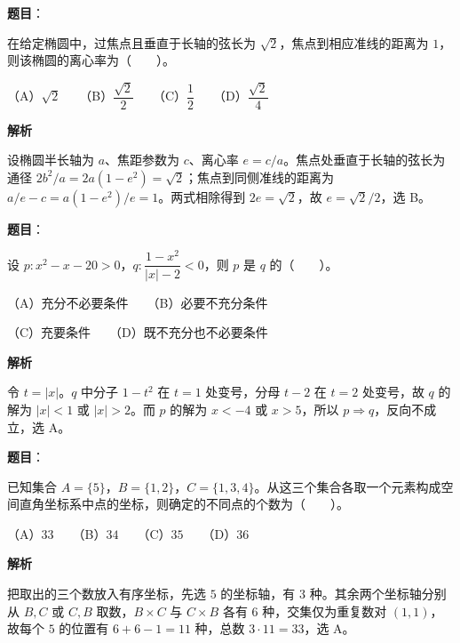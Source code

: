 \begin{answer}

\textbf{题目}：

在给定椭圆中，过焦点且垂直于长轴的弦长为 $\sqrt2$，焦点到相应准线的距离为 $1$，则该椭圆的离心率为\mbox{（　　）}。

（A）$\sqrt2$　　（B）$\dfrac{\sqrt2}{2}$　　（C）$\dfrac12$　　（D）$\dfrac{\sqrt2}{4}$

\textbf{解析}

设椭圆半长轴为 $a$、焦距参数为 $c$、离心率 $e=c/a$。焦点处垂直于长轴的弦长为通径 $2b^2/a=2a(1-e^2)=\sqrt2$；焦点到同侧准线的距离为 $a/e-c=a(1-e^2)/e=1$。两式相除得到 $2e=\sqrt2$，故 $e=\sqrt2/2$，选 B。


\end{answer}
\begin{answer}

\textbf{题目}：

设 $p\colon x^2-x-20>0$，$q\colon\dfrac{1-x^2}{|x|-2}<0$，则 $p$ 是 $q$ 的\mbox{（　　）}。

（A）充分不必要条件　　（B）必要不充分条件

（C）充要条件　　（D）既不充分也不必要条件

\textbf{解析}

令 $t=|x|$。$q$ 中分子 $1-t^2$ 在 $t=1$ 处变号，分母 $t-2$ 在 $t=2$ 处变号，故 $q$ 的解为 $|x|<1$ 或 $|x|>2$。而 $p$ 的解为 $x<-4$ 或 $x>5$，所以 $p\Rightarrow q$，反向不成立，选 A。


\end{answer}
\begin{answer}

\textbf{题目}：

已知集合 $A=\{5\}$，$B=\{1,2\}$，$C=\{1,3,4\}$。从这三个集合各取一个元素构成空间直角坐标系中点的坐标，则确定的不同点的个数为\mbox{（　　）}。

（A）$33$　　（B）$34$　　（C）$35$　　（D）$36$

\textbf{解析}

把取出的三个数放入有序坐标，先选 $5$ 的坐标轴，有 $3$ 种。其余两个坐标轴分别从 $B,C$ 或 $C,B$ 取数，$B\times C$ 与 $C\times B$ 各有 $6$ 种，交集仅为重复数对 $(1,1)$，故每个 $5$ 的位置有 $6+6-1=11$ 种，总数 $3\cdot11=33$，选 A。


\end{answer}
